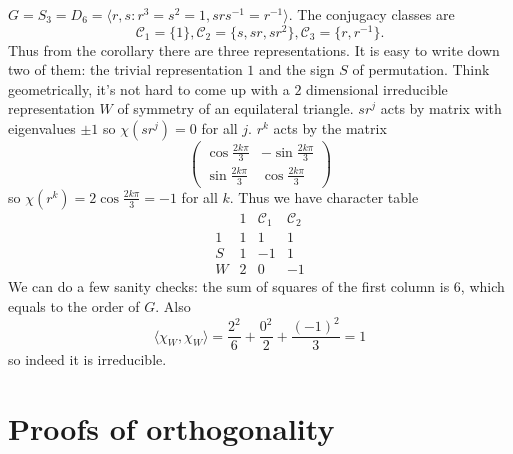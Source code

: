 \documentclass[a4paper]{article}
\newcommand{\ccl}{{\mathcal C}} %
\begin{document}
\begin{eg}
  \(G = S_3 = D_6 = \langle r, s: r^3 = s^2 = 1, srs^{-1} = r^{-1} \rangle\). The conjugacy classes are
  \[
    \ccl_1 = \{1\}, \ccl_2 = \{s, sr, sr^2\}, \ccl_3 = \{r, r^{-1}\}.
  \]
  Thus from the corollary there are three representations. It is easy to write down two of them: the trivial representation \(1\) and the sign \(S\) of permutation. Think geometrically, it's not hard to come up with a \(2\) dimensional irreducible representation \(W\) of symmetry of an equilateral triangle. \(sr^j\) acts by matrix with eigenvalues \(\pm 1\) so \(\chi(sr^j) = 0\) for all \(j\). \(r^k\) acts by the matrix
  \[
    \begin{pmatrix}
      \cos \frac{2k\pi}{3} & - \sin \frac{2k\pi}{3} \\
      \sin \frac{2k\pi}{3} & \cos \frac{2k\pi}{3}
    \end{pmatrix}
  \]
  so \(\chi(r^k) = 2 \cos \frac{2k\pi}{3} = - 1\) for all \(k\). Thus we have character table
  \[
    \begin{array}{c|ccc}
      & 1 & \ccl_1 & \ccl_2 \\ \hline
      1 & 1 & 1 & 1 \\
      S & 1 & -1 & 1 \\
      W & 2 & 0 & -1
    \end{array}
  \]
  We can do a few sanity checks: the sum of squares of the first column is \(6\), which equals to the order of \(G\). Also
  \[
    \langle \chi_W, \chi_W \rangle
    = \frac{2^2}{6} + \frac{0^2}{2} + \frac{(-1)^2}{3}
    = 1
  \]
  so indeed it is irreducible.
\end{eg}

\section{Proofs of orthogonality}

\end{document}

